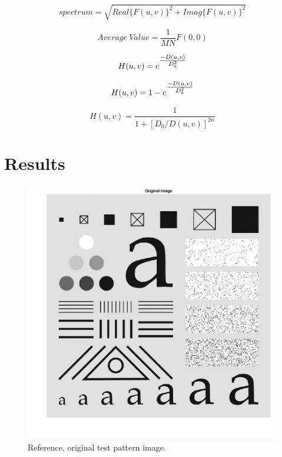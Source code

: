 \documentclass[./rarnold_report4.tex]{subfiles}
\begin{document}
\begin{equation}
\label{spec}
spectrum = \sqrt{Real\{F(u,v)\}^2 + Imag\{F(u,v)\}^2}
\end{equation}

\begin{equation}
\label{avg}
Average\:Value = \frac{1}{MN}F(0,0)
\end{equation}

\begin{equation}
\label{gauss_low}
H(u,v) = e^{\mathlarger{\frac{-D(u,v)}{D_{0}^{2}}}}
\end{equation}

\begin{equation}
\label{gauss_high}
H(u,v) = 1 - e^{\mathlarger{\frac{-D(u,v)}{D_{0}^{2}}}}
\end{equation}

\begin{equation}
\label{butter}
H(u,v) = \frac{1}{1+\left[ D_{0}/D(u,v)\right]^{2n}}
\end{equation}


\clearpage

\section*{Results}

  	\begin{figure}[!htbp]
	\centering
	\includegraphics[scale=0.30]{"problem4_og_image"}
	\captionsetup{justification=centering}
	\caption{Reference, original test pattern image.} 
	\label{orig}
	\end{figure}
  	
\end{document}
